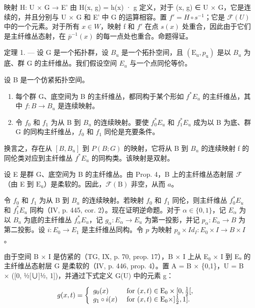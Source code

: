 映射 H: U × G → E' 由 H(x, g) = h(x) · g 定义，对于 (x, g) ∈ U × G，它是连续的，并且分别与 U × G 和 E' 中 G 的运算相容。置 \(f' = H \circ s^{-1}\)；它是 \(\mathcal{F}(U)\) 中的一个元素。对于所有 \(x \in W\)，映射 f 和 \(f'\) 在点 \(s(x)\) 处重合，因此由于它们是主纤维丛态射，在 \(\overline{p}^{-1}(x)\) 的每一点处也重合。命题得证。

定理 1. --- 设 G 是一个拓扑群，设 \(B_{u}\) 是一个拓扑空间，且 \((\mathrm{E}_{\mathrm{u}}, p_{\mathrm{u}})\) 是以 \(B_{u}\) 为底、群 G 的主纤维丛。我们假设空间 \(E_{u}\) 与一个点同伦等价。

设 B 是一个仿紧拓扑空间。

\begin{enumerate}
\def\labelenumi{\alph{enumi})}
\item
每个群 G、底空间为 B 的主纤维丛，都同构于某个形如 \(f^{*}E_{u}\) 的主纤维丛，其中 \(f: B \to B_{u}\) 是连续映射。
\item
令 \(f_{0}\) 和 \(f_{1}\) 为从 B 到 \(B_{u}\) 的连续映射。要使 \(f_{0}^{*}E_{u}\) 和 \(f_{1}^{*}E_{u}\) 成为以 B 为底、群 G 的同构主纤维丛，\(f_{0}\) 和 \(f_{1}\) 同伦是充要条件。
\end{enumerate}

换言之，存在从 \([B, B_{u}]\) 到 \(P(B; G)\) 的映射，它将从 B 到 \(B_{u}\) 的连续映射 f 的同伦类对应到主纤维丛 \(f^{*}E_{u}\) 的同构类。该映射是双射。

设 E 是群 G、底空间为 B 的主纤维丛。由 Prop. 4，B 上的主纤维丛态射层 \(\mathcal{F}\)（由 E 到 \(\mathrm{E_u}\)）是柔软的。因此，\(\mathcal{F}(\mathrm{B})\) 非空，从而 \(a\)。

令 \(f_{0}\) 和 \(f_{1}\) 为从 B 到 \(B_{u}\) 的连续映射。若映射 \(f_{0}\) 和 \(f_{1}\) 同伦，则主纤维丛 \(f_{0}^{*}E_{u}\) 和 \(f_{1}^{*}E_{u}\) 同构（IV, p. 445, cor. 2）。现在证明逆命题。对于 \(\alpha\in\{0,1\}\)，记 \(E_{\alpha}\) 为以 \(B_{u}\) 为底的主纤维丛 \(f_{\alpha}^{*}E_{u}\)，记 \(g_{\alpha} \colon E_{\alpha} \to E_{u}\) 为第一投影，并记 \(p_{\alpha} \colon E_{\alpha} \to B\) 为第二投影。设 \(i \colon E_{0} \to E_{1}\) 是主纤维丛同构。令 \(p\) 为映射 \(p_{0} \times Id_{I} \colon E_{0} \times I \to B \times I\)。

由于空间 B × I 是仿紧的（TG, IX, p. 70, prop. 17），B × I 上从 E₀ × I 到 Eᵤ 的主纤维丛态射层 G 是柔软的（IV, p. 446, prop. 4）。置 A = B × \{0,1\}，U = B × ([0, ½[∪]½, 1])，并通过下式定义 G(U) 中的元素 g：

\[
g (x, t) = \left\{ \begin{array}{l l} g _ {0} (x) & \text { for } (x, t) \in \mathrm{E} _ {0} \times [ 0, \frac {1}{2} [, \\ g _ {1} \circ i (x) & \text { for } (x, t) \in \mathrm{E} _ {0} \times ] \frac {1}{2}, 1 ]. \end{array} \right.
\]

